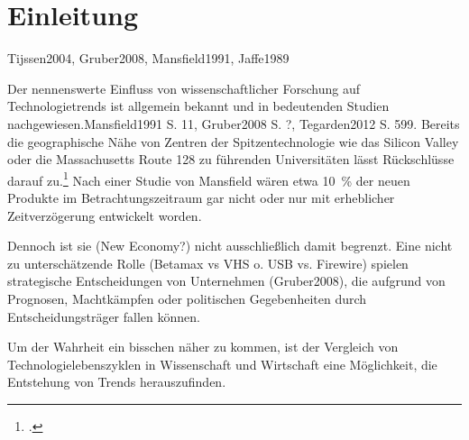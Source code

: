 \section{Einleitung}
Tijssen2004, Gruber2008, Mansfield1991, Jaffe1989

Der nennenswerte Einfluss von wissenschaftlicher Forschung auf Technologietrends ist allgemein bekannt und in bedeutenden Studien nachgewiesen.Mansfield1991 S. 11, Gruber2008 S. ?, Tegarden2012 S. 599. Bereits die geographische Nähe von Zentren der Spitzentechnologie wie das Silicon Valley oder die Massachusetts Route 128
zu führenden Universitäten lässt Rückschlüsse darauf zu.\footcite[Vgl.][S. 957]{Jaffe1989} Nach einer Studie von Mansfield wären etwa 10~\% der neuen Produkte im Betrachtungszeitraum gar nicht oder nur mit erheblicher Zeitverzögerung entwickelt worden.

Dennoch ist sie (New Economy?) nicht ausschließlich damit begrenzt. Eine nicht zu unterschätzende Rolle (Betamax vs VHS o. USB vs. Firewire) spielen strategische Entscheidungen von Unternehmen (Gruber2008), die aufgrund von Prognosen, Machtkämpfen oder politischen Gegebenheiten durch Entscheidungsträger fallen können.


Um der Wahrheit ein bisschen näher zu kommen, ist der Vergleich von Technologielebenszyklen in Wissenschaft und Wirtschaft eine Möglichkeit, die Entstehung von Trends herauszufinden.